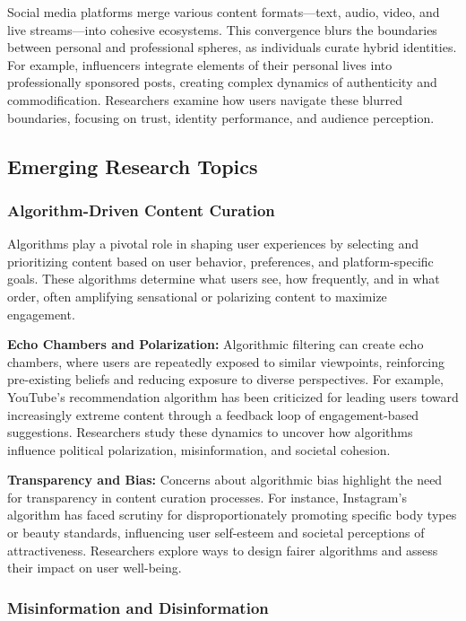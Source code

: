 \documentclass[
]{book}
\begin{document}
Social media platforms merge various content formats---text, audio, video, and live streams---into cohesive ecosystems. This convergence blurs the boundaries between personal and professional spheres, as individuals curate hybrid identities. For example, influencers integrate elements of their personal lives into professionally sponsored posts, creating complex dynamics of authenticity and commodification. Researchers examine how users navigate these blurred boundaries, focusing on trust, identity performance, and audience perception.

\subsection{Emerging Research Topics}\label{emerging-research-topics}

\subsubsection{Algorithm-Driven Content Curation}\label{algorithm-driven-content-curation}

Algorithms play a pivotal role in shaping user experiences by selecting and prioritizing content based on user behavior, preferences, and platform-specific goals. These algorithms determine what users see, how frequently, and in what order, often amplifying sensational or polarizing content to maximize engagement.

\textbf{Echo Chambers and Polarization:} Algorithmic filtering can create echo chambers, where users are repeatedly exposed to similar viewpoints, reinforcing pre-existing beliefs and reducing exposure to diverse perspectives. For example, YouTube's recommendation algorithm has been criticized for leading users toward increasingly extreme content through a feedback loop of engagement-based suggestions. Researchers study these dynamics to uncover how algorithms influence political polarization, misinformation, and societal cohesion.

\textbf{Transparency and Bias:} Concerns about algorithmic bias highlight the need for transparency in content curation processes. For instance, Instagram's algorithm has faced scrutiny for disproportionately promoting specific body types or beauty standards, influencing user self-esteem and societal perceptions of attractiveness. Researchers explore ways to design fairer algorithms and assess their impact on user well-being.

\subsubsection{Misinformation and Disinformation}\label{misinformation-and-disinformation}
\end{document}
